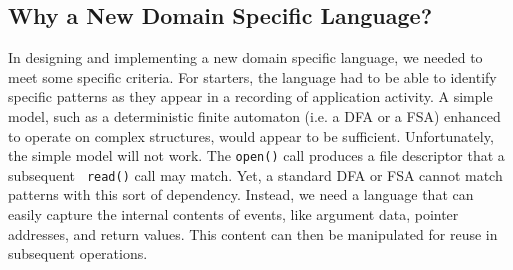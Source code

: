 \subsection{Why a New Domain Specific Language?}


In designing  and implementing a new domain specific language, we needed to meet some specific criteria. For starters, the language had to be able to identify specific
patterns as they appear in a recording of application activity.
A simple model,
such as a deterministic finite automaton (i.e. a DFA or a FSA) enhanced to operate on complex
structures, would appear to be sufficient.
Unfortunately, the simple model will not work.
The {\tt open()} call produces a file descriptor that a subsequent {\tt
read()} call may match.
Yet, a standard DFA or FSA cannot match patterns with this sort of dependency. 
Instead, we need a language
that can easily capture
the internal contents of events,
like argument data,
pointer addresses,
and return values. This content can then be
manipulated for
reuse in subsequent operations.




